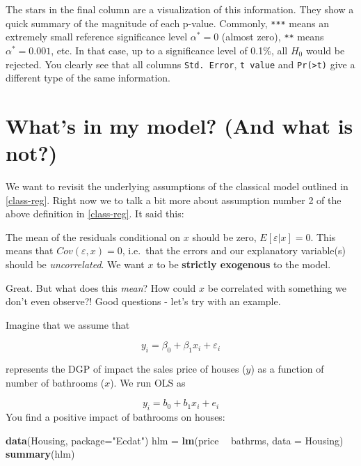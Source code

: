 \documentclass[]{book}
\newenvironment{Shaded}{\begin{snugshade}}{\end{snugshade}}
\newcommand{\DataTypeTok}[1]{\textcolor[rgb]{0.13,0.29,0.53}{#1}}
\newcommand{\KeywordTok}[1]{\textcolor[rgb]{0.13,0.29,0.53}{\textbf{#1}}}
\newcommand{\NormalTok}[1]{#1}
\newcommand{\OperatorTok}[1]{\textcolor[rgb]{0.81,0.36,0.00}{\textbf{#1}}}
\newcommand{\StringTok}[1]{\textcolor[rgb]{0.31,0.60,0.02}{#1}}
\newenvironment{warning}{\begin{tcolorbox}[colback=orange!5!white,colframe=orange]}{\end{tcolorbox}}
\begin{document}
The stars in the final column are a visualization of this information. They show a quick summary of the magnitude of each p-value. Commonly, \texttt{***} means an extremely small reference significance level \(\alpha^*=0\) (almost zero), \texttt{**} means \(\alpha^*=0.001\), etc. In that case, up to a significance level of 0.1\%, all \(H_0\) would be rejected. You clearly see that all columns \texttt{Std.\ Error}, \texttt{t\ value} and \texttt{Pr(\textgreater{}\textbar{}t\textbar{})} give a different type of the same information.

\hypertarget{whats-in-my-model-and-what-is-not}{%
\section{What's in my model? (And what is not?)}\label{whats-in-my-model-and-what-is-not}}

We want to revisit the underlying assumptions of the classical model outlined in \ref{class-reg}. Right now we to talk a bit more about assumption number 2 of the above definition in \ref{class-reg}. It said this:

\begin{warning}
The mean of the residuals conditional on \(x\) should be zero,
\(E[\varepsilon|x] = 0\). This means that \(Cov(\varepsilon,x) = 0\),
i.e.~that the errors and our explanatory variable(s) should be
\emph{uncorrelated}. We want \(x\) to be \textbf{strictly exogenous} to
the model.
\end{warning}

Great. But what does this \emph{mean}? How could \(x\) be correlated with something we don't even observe?! Good questions - let's try with an example.

Imagine that we assume that

\begin{equation}
y_i = \beta_0 + \beta_1 x_i + \varepsilon_i \label{eq:DGP-h}
\end{equation}

represents the DGP of impact the sales price of houses (\(y\)) as a function of number of bathrooms (\(x\)). We run OLS as

\[
y_i = b_0 + b_1 x_i + e_i 
\]
You find a positive impact of bathrooms on houses:

\begin{Shaded}
\begin{Highlighting}[]
\KeywordTok{data}\NormalTok{(Housing, }\DataTypeTok{package=}\StringTok{"Ecdat"}\NormalTok{)}
\NormalTok{hlm =}\StringTok{ }\KeywordTok{lm}\NormalTok{(price }\OperatorTok{~}\StringTok{ }\NormalTok{bathrms, }\DataTypeTok{data =}\NormalTok{ Housing)}
\KeywordTok{summary}\NormalTok{(hlm)}
\end{Highlighting}
\end{Shaded}
\end{document}
